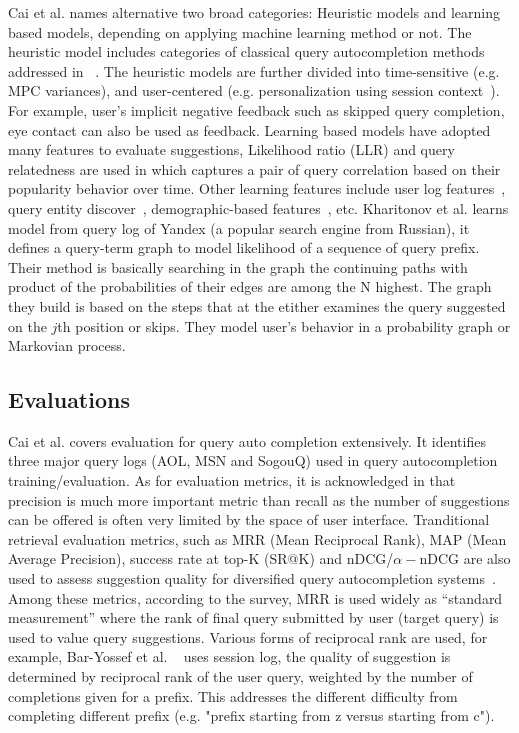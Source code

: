\documentclass[12pt]{article} %
\begin{document}
Cai et al. \cite{cai_survey_2016} names alternative two broad categories: Heuristic models and learning based models, depending on applying machine learning method or not.
The heuristic model includes categories of classical query autocompletion methods addressed in ~\cite{di_santo_comparing_2015}.
The heuristic models are further divided into time-sensitive (e.g. MPC variances), and user-centered (e.g. personalization using session context~\cite{schmidt_context_sensitive_2016}).
For example, user's implicit negative feedback such as skipped query completion, eye contact can also be used as feedback.
Learning based models have adopted many features to evaluate suggestions, Likelihood ratio (LLR) and query relatedness are used in \cite{chien_semantic_2005} which captures a pair of query correlation based on their popularity behavior over time. Other learning features include user log features~\cite{kharitonov_user_2013}, query entity discover~\cite{guo_named_2009}, demographic-based features~\cite{shokouhi_learning_2013}, etc.
Kharitonov et al. \cite{kharitonov_user_2013} learns model from query log of Yandex (a popular search engine from Russian),
it defines a query-term graph to model likelihood of a sequence of query prefix. Their
method is basically searching in the graph the continuing paths with product of
the probabilities of their edges are among the N highest.
The graph they build is based on the steps that at the etither examines the query suggested on the $j$th position or skips. They model user's behavior in a probability graph or Markovian process.

\subsection{Evaluations}
Cai et al. \cite{cai_survey_2016} covers evaluation for query auto completion extensively.
It identifies three major query logs (AOL, MSN and SogouQ) used in query autocompletion training/evaluation.
As for evaluation metrics, 
it is acknowledged in \cite{bhatia_query_2011} that precision is much more important metric than recall as the number of suggestions can be offered is often very limited by the space of user interface.
Tranditional retrieval evaluation metrics, such as MRR (Mean Reciprocal Rank),  MAP (Mean Average Precision), success rate at top-K (SR@K) and nDCG/$\alpha-$nDCG are also used to assess suggestion quality for diversified query autocompletion systems~\cite{cai_survey_2016}.
Among these metrics, according to the survey, MRR is used widely as ``standard measurement'' where the rank of final query submitted by user (target query) is used to value query suggestions.
Various forms of reciprocal rank are used, for example, 
Bar-Yossef et al. ~\cite{bar-yossef_context-sensitive_2011} uses session log, the quality of suggestion is determined by reciprocal rank
of the user query, weighted by the number of completions given for a prefix. This addresses the different difficulty from completing different prefix (e.g. "prefix starting from z versus starting from c").
\end{document}
